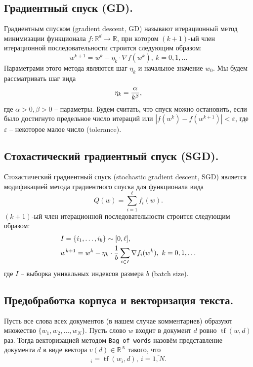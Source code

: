 \documentclass[12pt]{extarticle}
\newcommand{\R}{\mathbb{R}}
\DeclareMathOperator{\tf}{\text{tf}}
\let\U\relax
\DeclareMathOperator{\U}{\text{Uniform}}
\begin{document}
\subsection{Градиентный спуск (GD).}

Градиентным спуском (gradient descent, GD) называют итерационный метод минимизации функционала $f:\R^d\to\R$, при котором $(k+1)$-ый член итерационной последовательности строится следующим образом:
\begin{equation*}
    w^{k+1}=w^k-\eta_k\cdot\nabla f(w^k),\ k=0,1,\ldots
\end{equation*}
Параметрами этого метода являются шаг $\eta_k$ и начальное значение $w_0$. Мы будем рассматривать шаг вида
\begin{equation}\label{eq:gd_step}
    \eta_k={\alpha\over k^\beta},
\end{equation}
где $\alpha>0,\beta>0$ -- параметры. Будем считать, что спуск можно остановить, если было достигнуто предельное число итераций или $|f(w^k)-f(w^{k+1})|<\varepsilon$, где $\varepsilon$ -- некоторое малое число (tolerance).

\subsection{Стохастический градиентный спуск (SGD).}

Стохастический градиентный спуск (stochastic gradient descent, SGD) является модификацией метода градиентного спуска для функционала вида
\begin{equation*}
    Q(w)=\sum_{i=1}^\ell f_i(w).
\end{equation*}
$(k+1)$-ый член итерационной последовательности строится следующим образом:
\begin{align*}
    & I=\{i_1,\ldots,i_b\}\sim\U[0, \ell],\\
    & w^{k+1}=w^k-\eta_k\cdot{1\over b}\sum_{i\in I}\nabla f_i(w^k),\ k=0,1,\ldots
\end{align*}
где $I$ -- выборка уникальных индексов размера $b$ (batch size).

\subsection{Предобработка корпуса и векторизация текста.}

Пусть все слова всех документов (в нашем случае комментариев) образуют множество $\{w_1,w_2,\ldots,w_N\}$. Пусть слово $w$ входит в документ $d$ ровно $\tf(w, d)$ раз. Тогда векторизацией методом \texttt{Bag of words} назовём представление документа $d$ в виде вектора $v(d)\in\R^N$ такого, что
\begin{equation*}
    [v(d)]_i=\tf(w_i, d),\ i=\overline{1,N}. 
\end{equation*}
\end{document}
